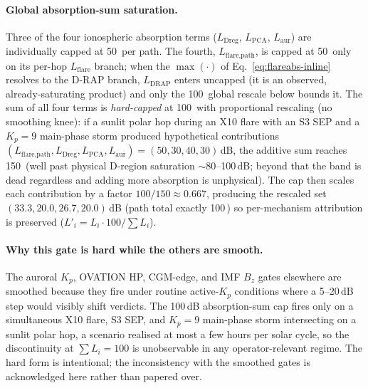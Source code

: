 \documentclass[11pt,a4paper]{article}
\newcommand{\SI}[2]{#1\,\text{#2}}
\newcommand{\dB}{\text{dB}}
\begin{document}
\paragraph{Global absorption-sum saturation.}  Three of the four
ionospheric absorption terms ($L_{\text{Dreg}}$, $L_{\text{PCA}}$,
$L_{\text{aur}}$) are individually capped at \SI{50}{\dB} per
path.  The fourth, $L_{\text{flare,path}}$, is capped at
\SI{50}{\dB} only on its per-hop $L_{\text{flare}}$ branch; when
the $\max(\cdot)$ of Eq.~\ref{eq:flareabs-inline} resolves to the
D-RAP branch, $L_{\text{DRAP}}$ enters uncapped (it is an
observed, already-saturating product) and only the \SI{100}{\dB}
global rescale below bounds it.  The sum of all four terms is
\emph{hard-capped} at \SI{100}{\dB} with proportional rescaling
(no smoothing knee): if a sunlit polar hop during an X10 flare
with an S3 SEP and a $K_p = 9$ main-phase storm produced
hypothetical contributions
$(L_{\text{flare,path}}, L_{\text{Dreg}}, L_{\text{PCA}}, L_{\text{aur}})
= (50, 30, 40, 30)$\,dB, the additive sum reaches \SI{150}{\dB}
(well past physical D-region saturation $\sim$80--100\,dB; beyond
that the band is dead regardless and adding more absorption is
unphysical).  The cap then scales each contribution by a factor
$100/150 \approx 0.667$, producing the rescaled set $(33.3, 20.0,
26.7, 20.0)$\,dB (path total exactly \SI{100}{\dB}) so
per-mechanism attribution is preserved
($L'_i = L_i \cdot 100/\sum L_i$).

\paragraph{Why this gate is hard while the others are smooth.}
The auroral $K_p$, OVATION HP, CGM-edge, and IMF $B_z$ gates
elsewhere are smoothed because they fire under routine
active-$K_p$ conditions where a 5--20\,dB step would visibly
shift verdicts.  The 100\,dB absorption-sum cap fires only on a
simultaneous X10 flare, S3 SEP, and $K_p = 9$ main-phase storm
intersecting on a sunlit polar hop, a scenario realised at most
a few hours per solar cycle, so the discontinuity at $\sum L_i =
100$ is unobservable in any operator-relevant regime.  The hard
form is intentional; the inconsistency with the smoothed gates is
acknowledged here rather than papered over.
\end{document}
